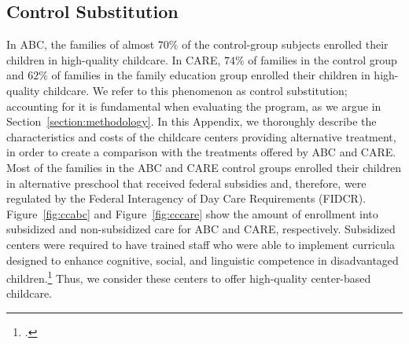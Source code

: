 \begin{appendices}
\subsection{Control Substitution}

\noindent In ABC, the families of almost $70\%$ of the control-group subjects enrolled their children in high-quality childcare. In CARE, $74\%$ of families in the control group and $62\%$ of families in the family education group enrolled their children in high-quality childcare. We refer to this phenomenon as control substitution; accounting for it is fundamental when evaluating the program, as we argue in Section~\ref{section:methodology}. In this Appendix, we thoroughly describe the characteristics and costs of the childcare centers providing alternative treatment, in order to create a comparison with the treatments offered by ABC and CARE.\\

\noindent Most of the families in the ABC and CARE control groups enrolled their children in alternative preschool that received federal subsidies and, therefore, were regulated by the Federal Interagency of Day Care Requirements (FIDCR). Figure~\ref{fig:ccabc} and Figure~\ref{fig:cccare} show the amount of enrollment into subsidized and non-subsidized care for ABC and CARE, respectively. Subsidized centers were required to have trained staff who were able to implement curricula designed to enhance cognitive, social, and linguistic competence in disadvantaged children.\footnote{\citet{Burchinal_etal_1989_CD_Daycare-Pre-K-Dev}.} Thus, we consider these centers to offer high-quality center-based childcare.


\end{appendices}
